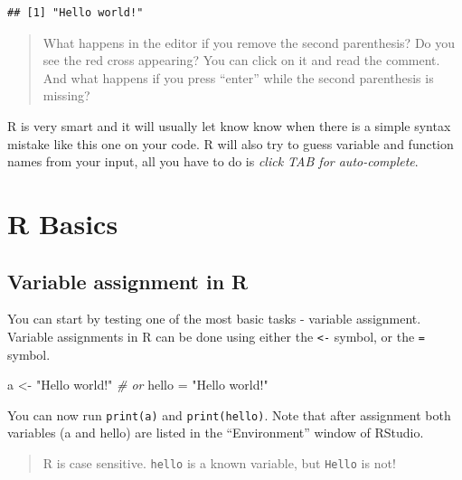 \documentclass[
]{book}
\newenvironment{Shaded}{\begin{snugshade}}{\end{snugshade}}
\newcommand{\CommentTok}[1]{\textcolor[rgb]{0.56,0.35,0.01}{\textit{#1}}}
\newcommand{\NormalTok}[1]{#1}
\newcommand{\OtherTok}[1]{\textcolor[rgb]{0.56,0.35,0.01}{#1}}
\newcommand{\StringTok}[1]{\textcolor[rgb]{0.31,0.60,0.02}{#1}}
\begin{document}
\begin{verbatim}
## [1] "Hello world!"
\end{verbatim}

\begin{quote}
What happens in the editor if you remove the second parenthesis?
Do you see the red cross appearing?
You can click on it and read the comment.\\
And what happens if you press ``enter'' while the second parenthesis is missing?\\
\end{quote}

R is very smart and it will usually let know know when there is a simple syntax mistake like this one on your code.
R will also try to guess variable and function names from your input, all you have to do is \emph{click TAB for auto-complete}.

\hypertarget{r-basics}{%
\section*{R Basics}\label{r-basics}}

\hypertarget{variable-assignment-in-r}{%
\subsection*{Variable assignment in R}\label{variable-assignment-in-r}}

You can start by testing one of the most basic tasks - variable assignment.
Variable assignments in R can be done using either the \texttt{\textless{}-} symbol, or the \texttt{=} symbol.

\begin{Shaded}
\begin{Highlighting}[]
\NormalTok{a }\OtherTok{\textless{}{-}} \StringTok{"Hello world!"}
\CommentTok{\# or}
\NormalTok{hello }\OtherTok{=} \StringTok{"Hello world!"}
\end{Highlighting}
\end{Shaded}

You can now run \texttt{print(a)} and \texttt{print(hello)}.
Note that after assignment both variables (a and hello) are listed in the ``Environment'' window of RStudio.

\begin{quote}
R is case sensitive.
\texttt{hello} is a known variable, but \texttt{Hello} is not!
\end{quote}
\end{document}
